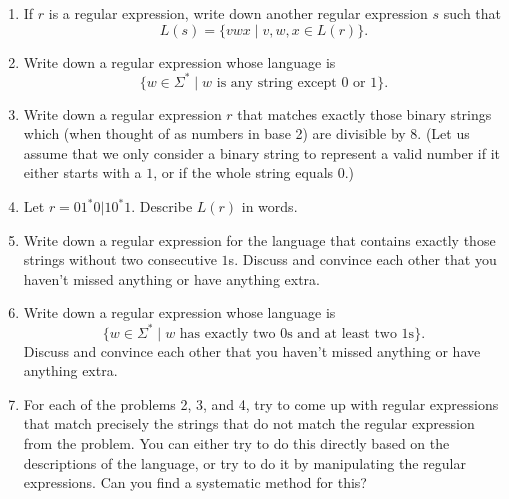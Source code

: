 \documentclass{amsart}
\begin{document}
\begin{enumerate}
\item If \(r\) is a regular expression, write down another regular expression \(s\) such that
\[L(s) = \{vwx\mid v, w, x \in L(r)\}.\]

\item Write down a regular expression whose language is
\[\{w \in \Sigma^*\mid w \text{ is any string except }0\text{ or }1\}.\]

\item Write down a regular expression \(r\) that matches exactly those binary strings which (when thought of as numbers in base 2) are divisible by \(8\).
(Let us assume that we only consider a binary string to represent a valid number if it either starts with a \(1\), or if the whole string equals \(0\).)

\item Let \(r = 01^*0|10^*1\). Describe \(L(r)\) in words.

\item Write down a regular expression for the language that contains exactly those strings without two consecutive \(1\)s. Discuss and convince each other that you haven't missed anything or have anything extra.

\item Write down a regular expression whose language is
\[\{w \in \Sigma^* \mid w\text{ has exactly two }0 \text{s and at least two }1\text{s}\}.\]
Discuss and convince each other that you haven't missed anything or have anything extra.

\item For each of the problems 2, 3, and 4, try to come up with regular expressions that match precisely the strings that do not match the regular expression from the problem. You can either try to do this directly based on the descriptions of the language, or try to do it by manipulating the regular expressions. Can you find a systematic method for this?
\end{enumerate}
\end{document}
